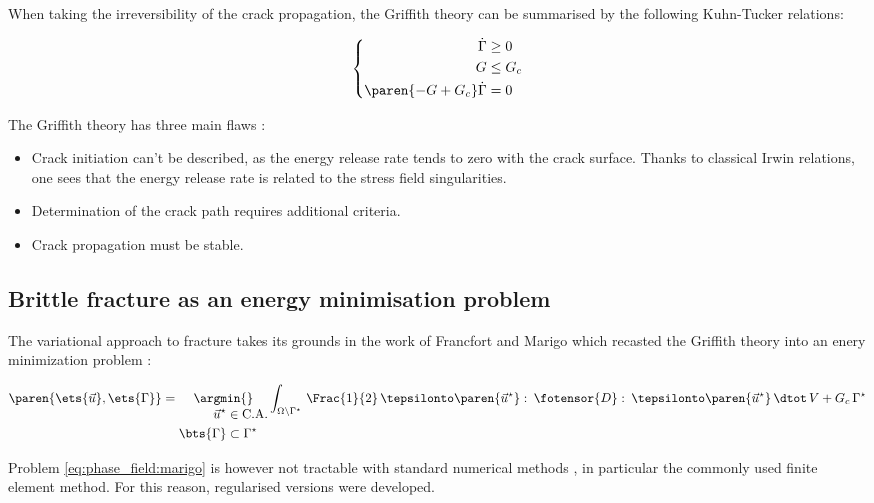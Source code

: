 When taking the irreversibility of the crack propagation, the Griffith
theory can be summarised by the following Kuhn-Tucker relations:

\[
\left\{
\begin{aligned}
\dot{\Gamma}&\geq 0\\
G &\leq G_{c}\\
\paren{-G +G_{c}}\dot{\Gamma}&=0
\end{aligned}
\right.
\]

The Griffith theory has three main flaws \cite{francfort_vers_2002}:

\begin{itemize}
    \item Crack initiation can't be described, as the energy release rate tends
    to zero with the crack surface. Thanks to classical Irwin relations,
    one sees that the energy release rate is related to the stress field
    singularities.
    \item Determination of the crack path requires additional criteria.
    \item Crack propagation must be stable.
\end{itemize}

\subsection{Brittle fracture as an energy minimisation problem}

The variational approach to fracture takes its grounds in the work of
Francfort and Marigo which recasted the Griffith theory into an enery
minimization problem \cite{francfort_revisiting_1998, francfort_vers_2002}:

\begin{equation}
    \label{eq:phase_field:marigo}
    \paren{\ets{\vec{u}},\ets{\Gamma}}=
    \underset{
    \begin{aligned}
    \vec{u}^{\star}&\in\text{C.A.}\\
    \bts{\Gamma}&\subset\Gamma^{\star}
    \end{aligned}
    }{\argmin{}}
    \int_{\Omega\backslash\Gamma^{\star}}\,\Frac{1}{2}\,\tepsilonto\paren{\vec{u}^{\star}}\,\colon\,\fotensor{D}\,\colon\,\tepsilonto\paren{\vec{u}^{\star}}\,\dtot\,V + G_{c}\,\Gamma^{\star}
\end{equation}

Problem \eqref{eq:phase_field:marigo} is however not tractable with standard
numerical methods
\cite{bourdin_numerical_2000, chambolle_approximation_2018}, in particular
the commonly used finite element method. For this reason, regularised
versions were developed.

